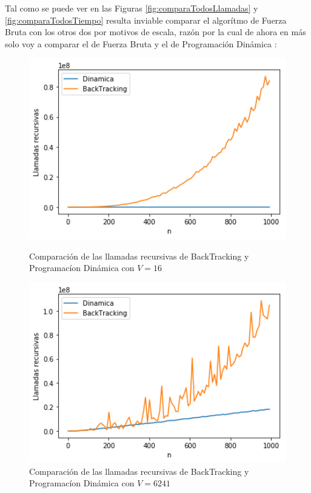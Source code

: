 Tal como se puede ver en las Figuras \ref{fig:comparaTodosLlamadas} y \ref{fig:comparaTodosTiempo} resulta
inviable comparar el algor\'itmo de Fuerza Bruta con los otros dos por motivos de escala, 
raz\'on por la cual de ahora en m\'as solo voy a comparar el de Fuerza Bruta y el de Programaci\'on Din\'amica :
\begin{figure}[H] 
    \centering
    \begin{minipage}{0.45\textwidth}
        \centering 
        \includegraphics[width=1\textwidth]{img/llamadas/v/llamadasBackDinamicavChico.png} %
        \caption{Comparaci\'on de las llamadas recursivas de BackTracking y Programac\'ion Din\'amica con $V = 16$}
        \label{fig:llamadasBackDinamicavChico}
    \end{minipage}\hfill
    \begin{minipage}{0.45\textwidth}
        \centering
        \includegraphics[width=1\textwidth]{img/llamadas/v/llamadasBackDinamicavGrande.png} %
        \caption{Comparaci\'on de las llamadas recursivas de BackTracking y Programac\'ion Din\'amica con $V = 6241$}
        \label{fig:llamadasBackDinamicavGrande} 
    \end{minipage}
\end{figure}

